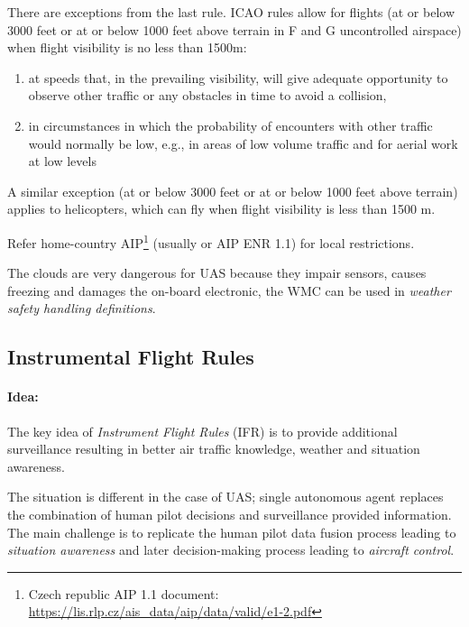 \noindent There are exceptions from the last rule. ICAO rules allow for flights (at or below 3000 feet or at or below 1000 feet above terrain in F and G uncontrolled airspace) when flight visibility is no less than 1500m:
\begin{enumerate}
    \item at speeds that, in the prevailing visibility, will give adequate opportunity to observe other traffic or any obstacles in time to avoid a collision,
    
    \item in circumstances in which the probability of encounters with other traffic would normally be low, e.g., in areas of low volume traffic and for aerial work at low levels
\end{enumerate}

\noindent A similar exception (at or below 3000 feet or at or below 1000 feet above terrain) applies to helicopters, which can fly when flight visibility is less than 1500 m.

Refer home-country AIP\footnote{Czech republic AIP 1.1 document: \url{https://lis.rlp.cz/ais_data/aip/data/valid/e1-2.pdf}} (usually  or AIP ENR 1.1) for local restrictions.

\begin{note}
    The clouds are very dangerous for UAS because they impair sensors, causes freezing and damages the on-board electronic, the WMC can be used in \emph{weather safety handling definitions}.
\end{note}

\subsection{Instrumental Flight Rules}\label{sec:InstrumentalFlightRules}
\paragraph{Idea:} The key idea of \emph{Instrument Flight Rules} (IFR) is to provide additional surveillance resulting in better air traffic knowledge, weather and situation awareness. 

The situation is different in the case of UAS; single autonomous agent replaces the combination of human pilot decisions and surveillance provided information. The main challenge is to replicate the human pilot data fusion process leading to \emph{situation awareness} and later decision-making process leading to \emph{aircraft control}.

